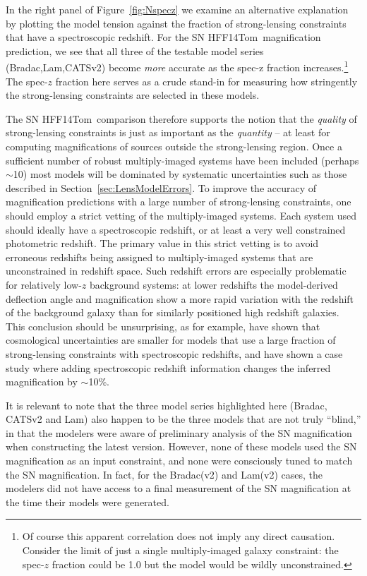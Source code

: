 \documentclass[iop]{emulateapj}
\def\tomas{HFF14Tom}
\begin{document}
In the right panel of Figure~\ref{fig:Nspecz} we examine an
alternative explanation by plotting the model tension against the
fraction of strong-lensing constraints that have a spectroscopic
redshift. 
For the SN \tomas\ magnification prediction, we see that all three of
the testable model series (Bradac,Lam,CATSv2) become {\it more}
accurate as the spec-z fraction increases.\footnote{Of course this
apparent correlation does not imply any direct causation. Consider the
limit of just a single multiply-imaged galaxy constraint: the spec-$z$
fraction could be 1.0 but the model would be wildly unconstrained.}
The spec-$z$ fraction here serves as a crude stand-in for measuring
how stringently the strong-lensing constraints are selected in these
models.

The SN \tomas\ comparison therefore supports the notion that the {\it
quality} of strong-lensing constraints is just as important as the
{\it quantity} -- at least for computing magnifications of sources
outside the strong-lensing region. Once a sufficient number of robust
multiply-imaged systems have been included (perhaps $\sim$10) most
models will be dominated by systematic uncertainties such as those
described in Section~\ref{sec:LensModelErrors}.  To improve the
accuracy of magnification predictions with a large number of
strong-lensing constraints, one should employ a strict vetting of the
multiply-imaged systems.  Each system used should ideally have a
spectroscopic redshift, or at least a very well constrained
photometric redshift.  The primary value in this strict vetting is to
avoid erroneous redshifts being assigned to multiply-imaged systems
that are unconstrained in redshift space.  Such redshift errors are
especially problematic for relatively low-$z$ background systems: at
lower redshifts the model-derived deflection angle and magnification
show a more rapid variation with the redshift of the background galaxy
than for similarly positioned high redshift galaxies. This conclusion
should be unsurprising, as for example, \citet{Bayliss:2015} have
shown that cosmological uncertainties are smaller for models that use
a large fraction of strong-lensing constraints with spectroscopic
redshifts, and \citet{Johnson:2014} have shown a case study where
adding spectroscopic redshift information changes the inferred
magnification by $\sim$10\%.



It is relevant to note that the three model series highlighted here
(Bradac, CATSv2 and Lam) also happen to be the three models that are
not truly ``blind,'' in that the modelers were aware of preliminary
analysis of the SN magnification when constructing the latest version.
However, none of these models used the SN magnification as an input
constraint, and none were consciously tuned to match the SN
magnification. In fact, for the Bradac(v2) and Lam(v2) cases, the
modelers did not have access to a final measurement of the SN
magnification at the time their models were generated.
\end{document}
